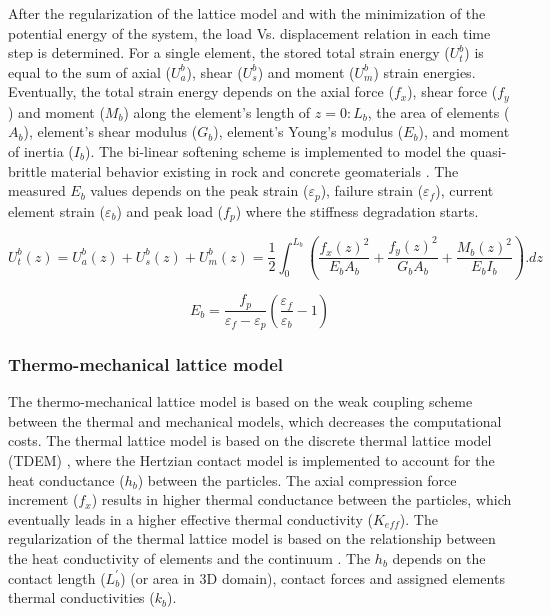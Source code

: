After the regularization of the lattice model and with the minimization of the potential energy of the system, the load Vs. displacement relation in each time step is determined. For a single element, the stored total strain energy ($U_t^b$) is equal to the sum of axial ($U_a^b$), shear ($U_s^b$) and moment ($U_m^b$) strain energies. Eventually, the total strain energy depends on the axial force ($f_x$), shear force ($f_y$) and moment ($M_b$) along the element's length of $z=0:L_b$, the area of elements ($A_b$), element's shear modulus ($G_b$), element's Young's modulus ($E_b$), and moment of inertia ($I_b$). The bi-linear softening scheme is implemented to model the quasi-brittle material behavior existing in rock and concrete geomaterials \cite{Inceetal2003}. The measured $E_b$ values depends on the peak strain ($\varepsilon_p$), failure  strain ($\varepsilon_f$), current element strain ($\varepsilon_b$) and peak load ($f_p$) where the stiffness degradation starts.

\begin{equation}
\label{eq:LEM_Mechanical_8}
 U_t^b(z)=U_a^b(z)+U_s^b(z)+U_m^b(z)=\frac{1}{2}\int_{0}^{L_b}{\left(\frac{f_x{(z)}^2}{E_b A_b}+\frac{f_y{(z)}^2}{G_b A_b}+\frac{M_b{(z)}^2}{E_b I_b}\right).dz} 
\end{equation}

\begin{equation}
\label{eq:LEM_Mechanical_9}
E_b=\frac{f_p}{\varepsilon_f-\varepsilon_p}\left(\frac{\varepsilon_f}{\varepsilon_b}-1\right)
\end{equation}

\subsubsection*{Thermo-mechanical lattice model}

The thermo-mechanical lattice model is based on the weak coupling scheme between the thermal and mechanical models, which decreases the computational costs. The thermal lattice model is based on the discrete thermal lattice model (TDEM) \cite{Zhangetal2011, Fengetal2008}, where the Hertzian contact model is implemented to account for the heat conductance ($h_b$) between the particles. The axial compression force increment ($f_x$) results in higher thermal conductance between the particles, which eventually leads in a higher effective thermal conductivity ($K_{eff}$). The regularization of the thermal lattice model is based on the relationship between the heat conductivity of elements and the continuum \cite{Rizvietal2018b}. The $h_b$ depends on the contact length ($L_b^\prime$) (or area in 3D domain), contact forces and assigned elements thermal conductivities ($k_{b}$).

